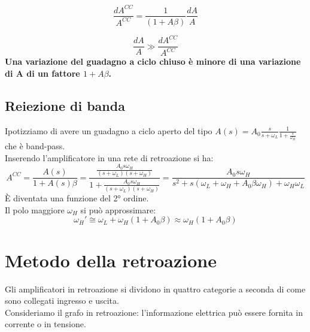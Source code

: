 \documentclass[a4paper, 12pt]{book}
\begin{document}
\begin{equation*}
    \frac{dA^{CC}}{A^{CC}}=\frac{1}{(1+A\beta)}\frac{dA}{A}
\end{equation*}

\begin{equation*}
    \frac{dA}{A}\gg\frac{dA^{CC}}{A^{CC}}
\end{equation*}
\textbf{Una variazione del guadagno a ciclo chiuso è minore di una variazione di A di un fattore $1+A\beta$.}

\section*{Reiezione di banda}
Ipotizziamo di avere un guadagno a ciclo aperto del tipo $A(s)= A_{0}\frac{s}{s+\omega_{L}}\frac{1}{1+\frac{s}{\omega_{H}}}$ che è band-pass.
\\Inserendo l'amplificatore in una rete di retroazione si ha:
\begin{equation*}
    A^{CC}=\frac{A(s)}{1+A(s)\beta}=\frac{\frac{A_{0}s\omega_{H}}{(s+\omega_{L})(s+\omega_{H})}}{1+\frac{A_{0}s\omega_{H}}{(s+\omega_{L})(s+\omega_{H})}}=
    \frac{A_{0}s\omega_{H}}{s^2+s(\omega_{L}+\omega_{H}+A_{0}\beta\omega_{H})+\omega_{H}\omega_{L}}
\end{equation*}
È diventata una funzione del 2° ordine.
\\Il polo maggiore $\omega_{H}$ si può approssimare:
\begin{equation*}
    \omega_{H}'\cong\omega_{L}+\omega_{H}(1+A_{0}\beta)\approx\omega_{H}(1+A_{0}\beta)
\end{equation*}

\chapter{Metodo della retroazione}
Gli amplificatori in retroazione si dividono in quattro categorie a seconda di come sono collegati ingresso e uscita.
\\Consideriamo il grafo in retroazione: l'informazione elettrica può essere fornita in corrente o in tensione.

\begin{figure}
    \begin{center}
    \end{center}
\end{figure}
\end{document}
